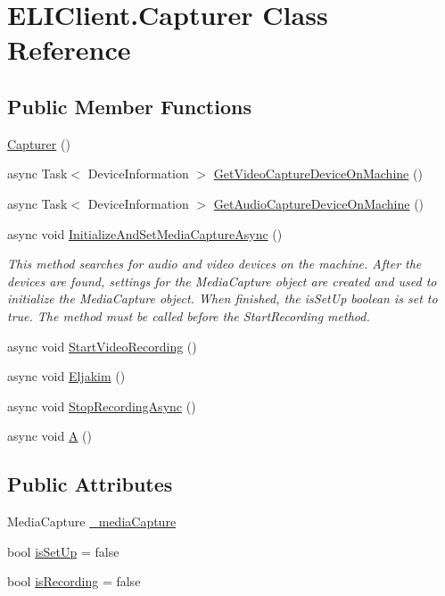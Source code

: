 \hypertarget{class_e_l_i_client_1_1_capturer}{}\section{E\+L\+I\+Client.\+Capturer Class Reference}
\label{class_e_l_i_client_1_1_capturer}
\subsection*{Public Member Functions}
\begin{DoxyCompactItemize}
\item 
\hyperlink{class_e_l_i_client_1_1_capturer_a3455ba52cb52e5297f02e95413eec9c5}{Capturer} ()
\item 
async Task$<$ Device\+Information $>$ \hyperlink{class_e_l_i_client_1_1_capturer_accf1111c1021efa12abdb1ebc7e2f394}{Get\+Video\+Capture\+Device\+On\+Machine} ()
\item 
async Task$<$ Device\+Information $>$ \hyperlink{class_e_l_i_client_1_1_capturer_a1b8998f20c6a85835fdbb900383c9e18}{Get\+Audio\+Capture\+Device\+On\+Machine} ()
\item 
async void \hyperlink{class_e_l_i_client_1_1_capturer_a5e64d7010dccca9d81ce8e758372a663}{Initialize\+And\+Set\+Media\+Capture\+Async} ()
\begin{DoxyCompactList}\small\item\em This method searches for audio and video devices on the machine. After the devices are found, settings for the Media\+Capture object are created and used to initialize the Media\+Capture object. When finished, the is\+Set\+Up boolean is set to true. The method must be called before the Start\+Recording method. \end{DoxyCompactList}\item 
async void \hyperlink{class_e_l_i_client_1_1_capturer_a319a1f370fec226ad47ba982812535af}{Start\+Video\+Recording} ()
\item 
async void \hyperlink{class_e_l_i_client_1_1_capturer_a1804509b6a4af7aff8d08943bb59da76}{Eljakim} ()
\item 
async void \hyperlink{class_e_l_i_client_1_1_capturer_a0b99d531c208233d08e9cb531f1e27ca}{Stop\+Recording\+Async} ()
\item 
async void \hyperlink{class_e_l_i_client_1_1_capturer_a9a472a3f53feb00c6bb1bb0689e52872}{A} ()
\end{DoxyCompactItemize}
\subsection*{Public Attributes}
\begin{DoxyCompactItemize}
\item 
Media\+Capture \hyperlink{class_e_l_i_client_1_1_capturer_afce477fff2b67de230a211ff3f639201}{\+\_\+media\+Capture}
\item 
bool \hyperlink{class_e_l_i_client_1_1_capturer_a99b1a695b80e8984744c065862eceb3e}{is\+Set\+Up} = false
\item 
bool \hyperlink{class_e_l_i_client_1_1_capturer_a2063ed98b28c4a20315abb65c46954fd}{is\+Recording} = false
\end{DoxyCompactItemize}
